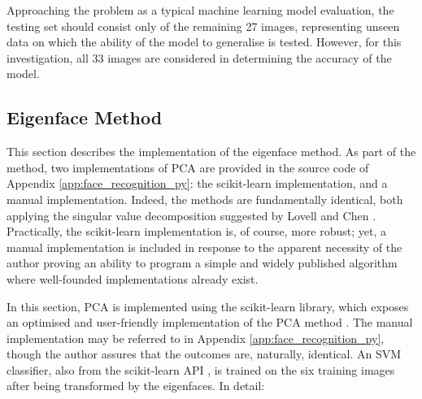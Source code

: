Approaching the problem as a typical machine learning model evaluation, the testing set should consist only of the remaining 27 images, representing unseen data on which the ability of the model to generalise is tested. However, for this investigation, all 33 images are considered in determining the accuracy of the model.

\subsection{Eigenface Method}

This section describes the implementation of the eigenface method. As part of the method, two implementations of PCA are provided in the source code of Appendix \ref{app:face_recognition_py}: the scikit-learn implementation, and a manual implementation. Indeed, the methods are fundamentally identical, both applying the singular value decomposition suggested by Lovell and Chen \cite{lovell_2008}. Practically, the scikit-learn implementation is, of course, more robust; yet, a manual implementation is included in response to the apparent necessity of the author proving an ability to program a simple and widely published algorithm where well-founded implementations already exist.

In this section, PCA is implemented using the scikit-learn library, which exposes an optimised and user-friendly implementation of the PCA method \cite{sklearn_2023}. The manual implementation may be referred to in Appendix \ref{app:face_recognition_py}, though the author assures that the outcomes are, naturally, identical. An SVM classifier, also from the scikit-learn API \cite{sklearn_2023b}, is trained on the six training images after being transformed by the eigenfaces. In detail:

